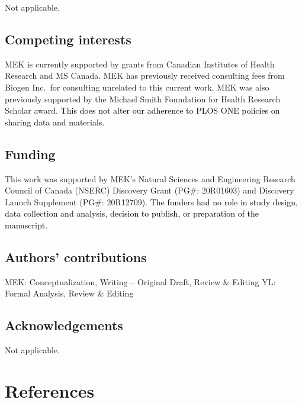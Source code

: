 \documentclass[10pt,letterpaper]{article}
\begin{document}
Not applicable.

\subsection*{Competing interests}\label{competing-interests}

MEK is currently supported by grants from Canadian Institutes of Health
Research and MS Canada. MEK has previously received consulting fees from
Biogen Inc.~for consulting unrelated to this current work. MEK was also
previously supported by the Michael Smith Foundation for Health Research
Scholar award.
\textcolor{black}{This does not alter our adherence to  PLOS ONE policies on sharing data and materials.}

\subsection*{Funding}\label{funding}

This work was supported by MEK's Natural Sciences and Engineering
Research Council of Canada (NSERC) Discovery Grant (PG\#: 20R01603) and
Discovery Launch Supplement (PG\#: 20R12709).
\textcolor{black}{The funders had no role in study design, data collection and analysis, decision to publish, or preparation of the manuscript.}

\subsection*{Authors' contributions}\label{authors-contributions}

MEK: Conceptualization, Writing -- Original Draft, Review \& Editing YL:
Formal Analysis, Review \& Editing

\subsection*{Acknowledgements}\label{acknowledgements}

Not applicable.

\section*{References}\label{references}
\end{document}
